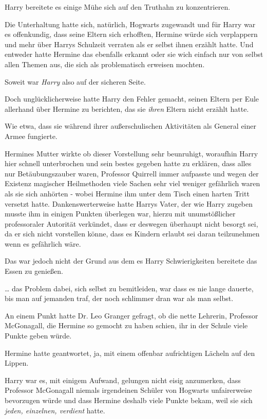 {Harry bereitete es einige Mühe sich auf den Truthahn zu konzentrieren.

Die Unterhaltung hatte sich, natürlich, Hogwarts zugewandt und für Harry war es offenkundig, dass seine Eltern sich erhofften, Hermine würde sich verplappern und mehr über Harrys Schulzeit verraten als er selbst ihnen erzählt hatte. Und entweder hatte Hermine das ebenfalls erkannt oder sie wich einfach nur von selbst allen Themen aus, die sich als problematisch erweisen mochten.

Soweit war \emph{Harry} also auf der sicheren Seite.

Doch unglücklicherweise hatte Harry den Fehler gemacht, seinen Eltern per Eule allerhand über Hermine zu berichten, das sie \emph{ihren} Eltern nicht erzählt hatte.

Wie etwa, dass sie während ihrer außerschulischen Aktivitäten als General einer Armee fungierte.

Hermines Mutter wirkte ob dieser Vorstellung sehr beunruhigt, woraufhin Harry hier schnell unterbrochen und sein bestes gegeben hatte zu erklären, dass alles nur Betäubungszauber waren, Professor Quirrell immer aufpasste und wegen der Existenz magischer Heilmethoden viele Sachen sehr viel weniger gefährlich waren als sie sich anhörten - wobei Hermine ihm unter dem Tisch einen harten Tritt versetzt hatte. Dankenswerterweise hatte Harrys Vater, der wie Harry zugeben musste ihm in einigen Punkten überlegen war, hierzu mit unumstößlicher professoraler Autorität verkündet, dass er deswegen überhaupt nicht besorgt sei, da er sich nicht vorstellen könne, dass es Kindern erlaubt sei daran teilzunehmen wenn es gefährlich wäre.

Das war jedoch nicht der Grund aus dem es Harry Schwierigkeiten bereitete das Essen zu genießen.

… das Problem dabei, sich selbst zu bemitleiden, war dass es nie lange dauerte, bis man auf jemanden traf, der noch schlimmer dran war als man selbst.

An einem Punkt hatte Dr. Leo Granger gefragt, ob die nette Lehrerin, Professor McGonagall, die Hermine so gemocht zu haben schien, ihr in der Schule viele Punkte geben würde.

Hermine hatte geantwortet, ja, mit einem offenbar aufrichtigen Lächeln auf den Lippen.

Harry war es, mit einigem Aufwand, gelungen nicht eisig anzumerken, dass Professor McGonagall niemals irgendeinen Schüler von Hogwarts unfairerweise bevorzugen würde und dass Hermine deshalb viele Punkte bekam, weil sie sich \emph{jeden, einzelnen, verdient} hatte.

}
